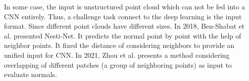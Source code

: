 


In some case, the input is unstructured point cloud which can not be fed into a CNN entirely. Thus, a challenge task connect to the deep learning is the input format. Since different point clouds have different sizes. 
In 2018, Ben-Shabat et al. \cite{Ben-Shabat_2019_CVPR} presented Nesti-Net. It predicts the normal point by point with the help of neighbor points. It fixed the distance of considering neighbors to provide an unified input for CNN. In 2021, Zhou et al. \cite{zhou2021fast} presents a method considering overlapping of different patches (a group of neighboring points) as input to evaluate normals. 
 















